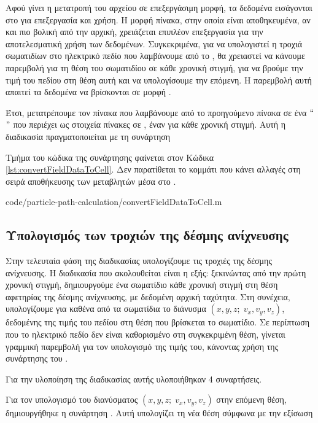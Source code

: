 Αφού γίνει η μετατροπή του αρχείου σε επεξεργάσιμη μορφή, τα δεδομένα εισάγονται στο  για επεξεργασία και χρήση.
Η μορφή πίνακα, στην οποία είναι αποθηκευμένα, αν και πιο βολική από την αρχική, χρειάζεται επιπλέον επεξεργασία για την αποτελεσματική χρήση των δεδομένων.
Συγκεκριμένα, για να υπολογιστεί η τροχιά σωματιδίων στο ηλεκτρικό πεδίο που λαμβάνουμε από το , θα χρειαστεί να κάνουμε παρεμβολή για τη θέση του σωματιδίου σε κάθε χρονική στιγμή, για να βρούμε την τιμή του πεδίου στη θέση αυτή και να υπολογίσουμε την επόμενη. 
Η παρεμβολή αυτή απαιτεί τα δεδομένα να βρίσκονται σε μορφή .

Έτσι, μετατρέπουμε τον πίνακα που λαμβάνουμε από το προηγούμενο πίνακα σε ένα $``$$"$ που περιέχει ως στοιχεία πίνακες σε , έναν για κάθε χρονική στιγμή. 
Αυτή η διαδικασία πραγματοποιείται με τη συνάρτηση 

Τμήμα του κώδικα της συνάρτησης φαίνεται στον Κώδικα \ref{lst:convertFieldDataToCell}. 
Δεν παρατίθεται το κομμάτι που κάνει αλλαγές στη σειρά αποθήκευσης των μεταβλητών μέσα στο .


{code/particle-path-calculation/convertFieldDataToCell.m}

\subsection{Υπολογισμός των τροχιών της δέσμης ανίχνευσης}

Στην τελευταία φάση της διαδικασίας υπολογίζουμε τις τροχιές της δέσμης ανίχνευσης.
Η διαδικασία που ακολουθείται είναι η εξής: ξεκινώντας από την πρώτη χρονική στιγμή, δημιουργούμε ένα σωματίδιο κάθε χρονική στιγμή στη θέση αφετηρίας της δέσμης ανίχνευσης, με δεδομένη αρχική ταχύτητα.
Στη συνέχεια, υπολογίζουμε για καθένα από τα σωματίδια το διάνυσμα $\left(x, y, z;\; v_x, v_y, v_z\right)$, δεδομένης της τιμής  του πεδίου στη θέση που βρίσκεται το σωματίδιο.
Σε περίπτωση που το ηλεκτρικό πεδίο δεν είναι καθορισμένο στη συγκεκριμένη θέση, γίνεται γραμμική παρεμβολή για τον υπολογισμό της τιμής του, κάνοντας χρήση της συνάρτησης του  .

Για την υλοποίηση της διαδικασίας αυτής υλοποιήθηκαν 4 συναρτήσεις.

Για τον υπολογισμό του διανύσματος $\left(x, y, z;\; v_x, v_y, v_z\right)$ στην επόμενη θέση, δημιουργήθηκε η συνάρτηση .
Αυτή υπολογίζει τη νέα θέση σύμφωνα με την εξίσωση 

